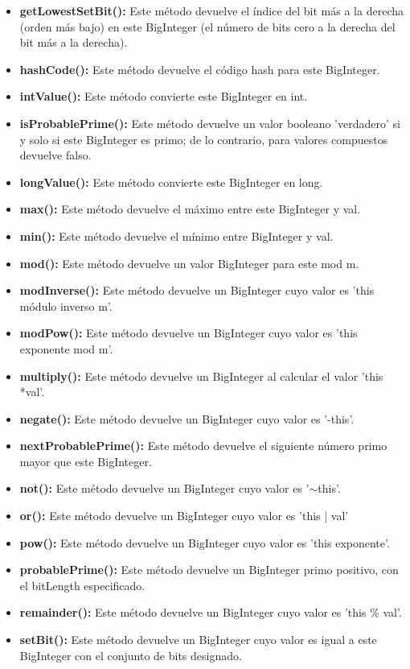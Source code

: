 \begin{itemize}
\item \textbf{getLowestSetBit():} Este método devuelve el índice del bit más a la derecha (orden más bajo) en este BigInteger (el número de bits cero a la derecha del bit más a la derecha).
\item \textbf{hashCode():} Este método devuelve el código hash para este BigInteger.
\item \textbf{intValue():} Este método convierte este BigInteger en int.
\item \textbf{isProbablePrime():} Este método devuelve un valor booleano 'verdadero' si y solo si este BigInteger es primo; de lo contrario, para valores compuestos devuelve falso.
\item \textbf{longValue():} Este método convierte este BigInteger en long.
\item \textbf{max():} Este método devuelve el máximo entre este BigInteger y val.
\item \textbf{min():} Este método devuelve el mínimo entre BigInteger y val.
\item \textbf{mod():} Este método devuelve un valor BigInteger para este mod m.
\item \textbf{modInverse():} Este método devuelve un BigInteger cuyo valor es 'this módulo inverso m'.
\item \textbf{modPow():} Este método devuelve un BigInteger cuyo valor es 'this exponente mod m'.
\item \textbf{multiply():} Este método devuelve un BigInteger al calcular el valor 'this *val'.
\item \textbf{negate():} Este método devuelve un BigInteger cuyo valor es '-this'.
\item \textbf{nextProbablePrime():} Este método devuelve el siguiente número primo mayor que este BigInteger.
\item \textbf{not():} Este método devuelve un BigInteger cuyo valor es '$\sim$this'.
\item \textbf{or():} Este método devuelve un BigInteger cuyo valor es 'this | val'
\item \textbf{pow():} Este método devuelve un BigInteger cuyo valor es 'this exponente'.
\item \textbf{probablePrime():} Este método devuelve un BigInteger primo positivo, con el bitLength especificado.
\item \textbf{remainder():} Este método devuelve un BigInteger cuyo valor es 'this \% val'.
\item \textbf{setBit():} Este método devuelve un BigInteger cuyo valor es igual a este BigInteger con el conjunto de bits designado.

\end{itemize}
